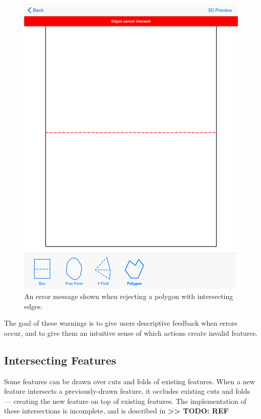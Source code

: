\begin{figure}[htbp]
\centering
\includegraphics{figures/32_UI_Tool_Interactions/error_message.png}
\caption{An error message shown when rejecting a polygon with
intersecting edges.}
\end{figure}

The goal of these warnings is to give users descriptive feedback when
errors occur, and to give them an intuitive sense of which actions
create invalid features.

\subsection{Intersecting Features}\label{intersecting-features-1}

Some features can be drawn over cuts and folds of existing features.
When a new feature intersects a previously-drawn feature, it occludes
existing cuts and folds --- creating the new feature on top of existing
features. The implementation of these intersections is incomplete, and
is described in \textbf{\textgreater{}\textgreater{} TODO: REF}

